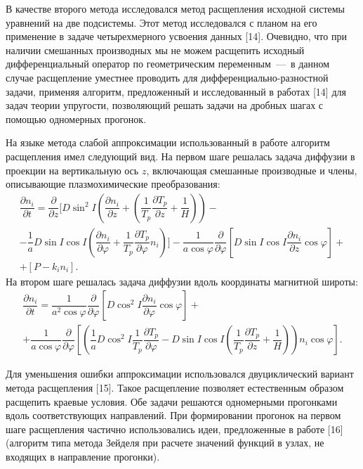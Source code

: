 \documentclass[14pt, a4paper]{extarticle}
\begin{document}
В качестве второго метода исследовался метод расщепления исходной системы уравнений на две подсистемы. Этот метод исследовался с планом на его применение в задаче четырехмерного усвоения данных [14]. Очевидно, что при наличии смешанных производных мы не можем расщепить исходный дифференциальный оператор по геометрическим переменным~---~в данном случае расщепление уместнее проводить для дифференциально-разностной задачи, применяя алгоритм, предложенный и исследованный в работах [14] для задач теории упругости, позволяющий решать задачи на дробных шагах с помощью одномерных прогонок.

На языке метода слабой аппроксимации использованный в работе алгоритм расщепления имел следующий вид. На первом шаге решалась задача диффузии в проекции на вертикальную ось $z$, включающая смешанные производные и члены, описывающие плазмохимические преобразования:
\begin{gather}
\dfrac{\partial n_i}{\partial t} = \dfrac{\partial}{\partial z}\bigg[D\sin^2 I \left(\dfrac{\partial n_i}{\partial z} + \left(\dfrac{1}{T_p}\dfrac{\partial T_p}{\partial z}+\dfrac{1}{H}\right)\right)- \nonumber\\- \dfrac{1}{a}D\sin I \cos I \left(\dfrac{\partial n_i}{\partial \varphi} + \dfrac{1}{T_p}\dfrac{\partial T_p}{\partial \varphi} n_i\right)\bigg] -
 \dfrac{1}{a\cos\varphi}\dfrac{\partial}{\partial\varphi}\left[D\sin I \cos I \dfrac{\partial n_i}{\partial z}\cos\varphi\right] +\nonumber\\ + [P-k_i n_i].
\end{gather}
На втором шаге решалась задача диффузии вдоль координаты магнитной широты:
\begin{gather}
\dfrac{\partial n_i}{\partial t} = \dfrac{1}{a^2\cos\varphi}\dfrac{\partial}{\partial \varphi}\left[D\cos^2 I \dfrac{\partial n_i}{\partial\varphi} \cos\varphi\right] +\nonumber\\
+ \dfrac{1}{a\cos\varphi} \dfrac{\partial}{\partial\varphi}\left[\left(\dfrac{1}{a}D\cos^2 I \dfrac{1}{T_p}\dfrac{\partial T_p}{\partial \varphi} - D\sin I \cos I \left(\dfrac{1}{T_p}\dfrac{\partial T_p}{\partial z} + \dfrac{1}{H}\right)\right)n_i \cos\varphi\right].
\end{gather}


Для уменьшения ошибки аппроксимации использовался двуциклический вариант метода расщепления [15]. Такое расщепление позволяет естественным образом расщепить краевые условия. Обе задачи решаются одномерными прогонками вдоль соответствующих направлений. При формировании прогонок на первом шаге расщепления частично использовались идеи, предложенные в работе [16] (алгоритм типа метода Зейделя при расчете значений функций в узлах, не входящих в направление прогонки).
\end{document}
